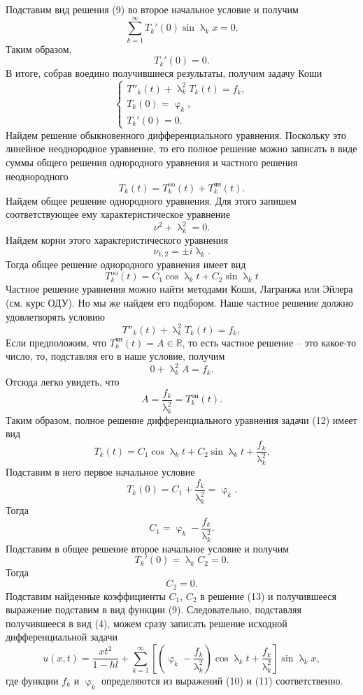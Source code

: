 \documentclass[a4paper, 12pt]{report}
\numberwithin{equation}{section}
\newcommand{\Rm}{\mathbb{R}}
\renewcommand{\varphi}{\upvarphi}
\renewcommand{\lambda}{\uplambda}
\newcommand{\sumk}{\sum\limits_{k=1}^\infty}
\begin{document}
	 Подставим вид решения (9) во второе начальное условие и получим
	 $$\sumk T_k'(0) \sin \lambda_k x = 0 .$$
	 Таким образом, $$T_k'(0) = 0.$$
	 В итоге, собрав воедино получившиеся результаты, получим задачу Коши 
	 \begin{equation}
	 	\begin{cases}
	 		T''_k(t) + \lambda_k^2 T_k(t) = f_k,\\
	 		T_k (0) = \varphi_k,\\
	 		T_k'(0) = 0.
	 	\end{cases}
	 \end{equation}
	 Найдем решение обыкновенного дифференциального уравнения. Поскольку это линейное неоднородное уравнение, то его полное решение можно записать в виде суммы общего решения однородного уравнения и частного решения неоднородного $$T_k(t) = T^{\text{oo}}_k(t) + T^{\text{чн}}_k(t).$$
	 Найдем общее решение однородного уравнения. Для этого запишем соответствующее ему характеристическое уравнение
	 $$\nu^2 + \lambda_k ^2 = 0.$$
	 Найдем корни этого характеристического уравнения
	 $$\nu_{1,2} = \pm i \lambda_k.$$
	 Тогда общее решение однородного уравнения имеет вид
	 \begin{equation*}
	 	T^{\text{oo}}_k(t) = C_1 \cos \lambda_k t + C_2 \sin \lambda_k t
	 \end{equation*}
	 Частное решение уравнения можно найти методами Коши, Лагранжа или Эйлера (см. курс ОДУ). Но мы же найдем его подбором. Наше частное решение должно удовлетворять условию $$T''_k(t) + \lambda_k^2 T_k(t) = f_k,$$
	 Если предположим, что $T^{\text{чн}}_k(t) = A\in \Rm$, то есть частное решение -- это какое-то число, то, подставляя его в наше условие, получим
	 $$0+\lambda ^2_k A = f_k.$$
	 Отсюда легко увидеть, что $$A = \dfrac{f_k}{\lambda_k^2} = T^{\text{чн}}_k(t).$$ 
	 Таким образом, полное решение дифференциального уравнения задачи (12) имеет вид
	 \begin{equation}
	 	T_k(t) = C_1 \cos \lambda_k t + C_2 \sin \lambda_k t + \dfrac{f_k}{\lambda_k^2}.
	 \end{equation}
	 Подставим в него первое начальное условие
	 $$T_k(0) = C_1 + \dfrac{f_k}{\lambda_k^2} = \varphi_k.$$
	 Тогда $$C_1 = \varphi_k - \dfrac{f_k}{\lambda_k^2}.$$
	 Подставим в общее решение второе начальное условие и получим
	 $$T_k'(0) = \lambda_k C_2 = 0.$$
	 Тогда $$C_2 = 0.$$
	 Подставим найденные коэффициенты $C_1$, $C_2$ в решение (13) и получившееся выражение подставим в вид функции (9). Следовательно, подставляя получившееся в вид (4), можем сразу записать решение исходной дифференциальной задачи
	 \begin{equation}
	 	u(x,t) =\dfrac{xt^2}{1-hl} + \sumk \left[\left(\varphi_k - \dfrac{f_k}{\lambda_k^2}\right) \cos \lambda_k t + \dfrac{f_k}{\lambda_k^2}\right]\sin \lambda_k x,
	 \end{equation}
	 где функции $f_k$ и $\varphi_k$ определяются из выражений (10) и (11) соответственно.
\end{document}
